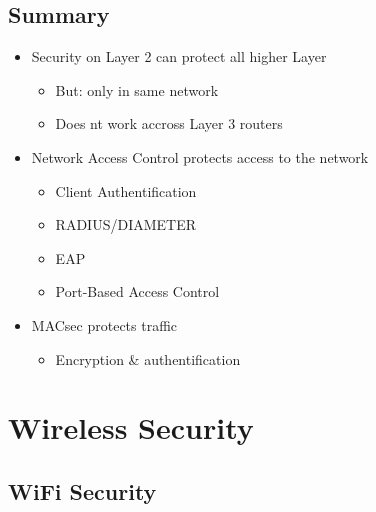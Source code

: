  \subsection{Summary}
\begin{itemize}
  \item Security on Layer 2 can protect all higher Layer
    \begin{itemize}
      \item But: only in same network
      \item Does nt work accross Layer 3 routers
    \end{itemize}
  \item Network Access Control protects access to the network
    \begin{itemize}
      \item Client Authentification
      \item RADIUS/DIAMETER
      \item EAP
      \item Port-Based Access Control
    \end{itemize}
  \item MACsec protects traffic
  \begin{itemize}
    \item Encryption \& authentification
  \end{itemize}
\end{itemize}

\section{Wireless Security}
\subsection{WiFi Security}
